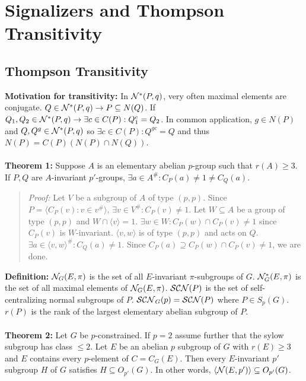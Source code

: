 \chapter{Signalizers and Thompson Transitivity}
\section{Thompson Transitivity}
{\bf Motivation for transitivity:}
In ${\cal N}^*(P, q)$, very often maximal elements are conjugate.
$Q \in {\cal N}^*(P, q) \rightarrow P \subseteq N(Q)$.  If
$Q_1, Q_2 \in {\cal N}^*(P, q) \rightarrow \exists c \in C(P): Q_1^c = Q_2$.
In common application, $g \in N(P)$ and $Q, Q^g \in
{\cal N}^*(P, q)$ so $\exists c \in C(P): Q^{gc}=Q$ and thus $N(P)= C(P) (N(P) \cap N(Q))$.
\\
\\
{\bf Theorem 1:}  Suppose  $A$ is an elementary abelian $p$-group such that $r(A) \ge 3$.
If $P, Q$ are $A$-invariant $p'$-groups, $\exists a \in A^{\#}: C_P(a) \ne 1 \ne C_Q(a)$.
\begin{quote}
\emph{Proof:}  
Let $V$ be a subgroup of $A$ of type $(p,p)$.  Since $P= \langle C_P(v): v \in v^{\#} \rangle $,
$\exists v \in V^{\#}: C_P(v) \ne 1$.  Let $W \subseteq A$ be a group of type $(p,p)$ and
$W \cap \langle v \rangle = 1$.  $\exists w \in W: C_P(w) \cap C_P(v) \ne 1$ since
$C_P(v)$ is $W$-invariant.  $ \langle v,w \rangle $ is of type $(p,p)$ and acts on $Q$.
$\exists a \in \langle v,w \rangle^{\#}: C_Q(a) \ne 1$.  Since 
$C_P(a) \supseteq C_P(w) \cap C_P(v) \ne 1$, we are done.
\end{quote}
{\bf Definition:} 
${\cal N}_G(E, \pi)$ is the set of all $E$-invariant $\pi$-subgroups of $G$.
${\cal N}_G^*(E, \pi)$ is the set of all maximal elements of
${\cal N}_G(E, \pi)$.
${\cal SCN}(P)$ is the set of self-centralizing normal subgroups of $P$.
${\cal SCN}_G(p)= {\cal SCN}(P)$ where $P \in S_p(G)$.
$r(P)$ is the rank of the largest elementary abelian subgroup of $P$.
\\
\\
{\bf Theorem 2:}  Let $G$ be $p$-constrained.  If $p=2$ assume further
that the sylow subgroup has class $\le 2$.  Let $E$ be an abelian $p$ subgroup of $G$ with
$r(E) \ge 3$ and $E$ contains every $p$-element of $C= C_G(E)$.  Then
every $E$-invariant $p'$ subgroup $H$ of $G$ satisfies $H \subseteq O_{p'}(G)$.  In other
words, $ \langle {\cal N}(E, p') \rangle \subseteq O_{p'}(G)$.
